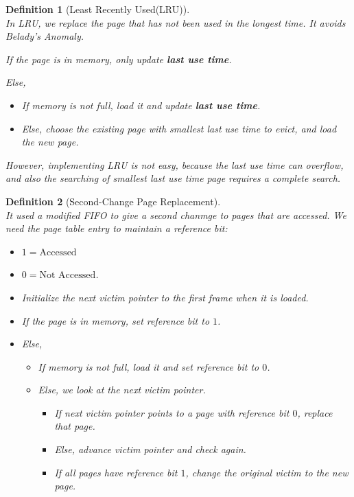 \documentclass[12pt]{article}
\newtheorem{definition}{Definition}[section]
\theoremstyle{definition}
\begin{document}
\begin{definition}[Least Recently Used(LRU)]
\hfill\\\normalfont In LRU, we replace the page that has not been used in the longest time. It avoids Belady's Anomaly.
\item If the page is in memory, only update \textbf{last use time}.
\item Else, 
\begin{itemize}
  \item If memory is not full, load it and update \textbf{last use time}.
  \item Else, choose the existing page with smallest last use time to evict, and load the new page.
\end{itemize}
However, implementing LRU is not easy, because the last use time can overflow, and also the searching of smallest last use time page requires a complete search.
\end{definition}
\begin{definition}[Second-Change Page Replacement]
\hfill\\\normalfont It used a modified FIFO to give a second chanmge to pages that are accessed. We need the page table entry to maintain a reference bit:
\begin{itemize}
  \item $1=\text{Accessed}$
  \item $0=\text{Not Accessed}$.
\end{itemize}
\begin{itemize}
\item Initialize the next victim pointer to the first frame when it is loaded.
\item If the page is in memory, set reference bit to $1$.
\item Else, 
\begin{itemize}
  \item If memory is not full, load it and set reference bit to $0$.
  \item Else, we look at the next victim pointer.
  \begin{itemize}
    \item If next victim pointer points to a page with reference bit $0$, replace that page.
    \item Else, advance victim pointer and check again.
    \item If all pages have reference bit $1$, change the original victim to the new page.
  \end{itemize}
\end{itemize}
\end{itemize}
\end{definition}
\end{document}
